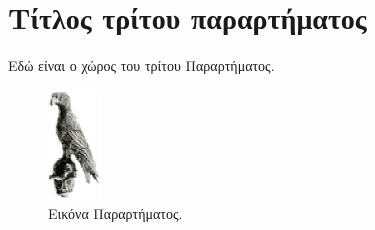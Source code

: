 \chapter{Τίτλος τρίτου παραρτήματος}
\label{app:ThirdAppendix}

Εδώ είναι ο χώρος του τρίτου Παραρτήματος.

\begin{figure}[h]
	\centering
	\includegraphics[width=0.125\textwidth]{Figures/bird.eps}
	\caption{Εικόνα Παραρτήματος.}
	\label{fig:AppendixFigure}
\end{figure}
